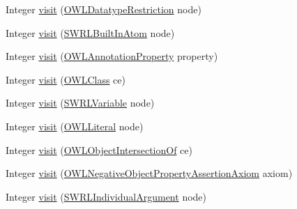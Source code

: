 \begin{DoxyCompactItemize}
\item 
Integer \hyperlink{classorg_1_1semanticweb_1_1owlapi_1_1util_1_1_maximum_modal_depth_finder_a05e043f519f8f383d69facb25d736ff8}{visit} (\hyperlink{interfaceorg_1_1semanticweb_1_1owlapi_1_1model_1_1_o_w_l_datatype_restriction}{O\-W\-L\-Datatype\-Restriction} node)
\item 
Integer \hyperlink{classorg_1_1semanticweb_1_1owlapi_1_1util_1_1_maximum_modal_depth_finder_ae52d767e6f9f6c91e60ee5436693e471}{visit} (\hyperlink{interfaceorg_1_1semanticweb_1_1owlapi_1_1model_1_1_s_w_r_l_built_in_atom}{S\-W\-R\-L\-Built\-In\-Atom} node)
\item 
Integer \hyperlink{classorg_1_1semanticweb_1_1owlapi_1_1util_1_1_maximum_modal_depth_finder_a19bf5a454049a88ef388d31c29e5a9e4}{visit} (\hyperlink{interfaceorg_1_1semanticweb_1_1owlapi_1_1model_1_1_o_w_l_annotation_property}{O\-W\-L\-Annotation\-Property} property)
\item 
Integer \hyperlink{classorg_1_1semanticweb_1_1owlapi_1_1util_1_1_maximum_modal_depth_finder_a037f9af7b994ca282ddf0e9843b02f1b}{visit} (\hyperlink{interfaceorg_1_1semanticweb_1_1owlapi_1_1model_1_1_o_w_l_class}{O\-W\-L\-Class} ce)
\item 
Integer \hyperlink{classorg_1_1semanticweb_1_1owlapi_1_1util_1_1_maximum_modal_depth_finder_a57c11406f4e47a2b0a8fac41d10890ad}{visit} (\hyperlink{interfaceorg_1_1semanticweb_1_1owlapi_1_1model_1_1_s_w_r_l_variable}{S\-W\-R\-L\-Variable} node)
\item 
Integer \hyperlink{classorg_1_1semanticweb_1_1owlapi_1_1util_1_1_maximum_modal_depth_finder_ac45adcd9b4cc804182bc7886ebd8376b}{visit} (\hyperlink{interfaceorg_1_1semanticweb_1_1owlapi_1_1model_1_1_o_w_l_literal}{O\-W\-L\-Literal} node)
\item 
Integer \hyperlink{classorg_1_1semanticweb_1_1owlapi_1_1util_1_1_maximum_modal_depth_finder_abf0bafa9a1e5b19b675c9078fbac44c6}{visit} (\hyperlink{interfaceorg_1_1semanticweb_1_1owlapi_1_1model_1_1_o_w_l_object_intersection_of}{O\-W\-L\-Object\-Intersection\-Of} ce)
\item 
Integer \hyperlink{classorg_1_1semanticweb_1_1owlapi_1_1util_1_1_maximum_modal_depth_finder_af25e759fc3441dd921948c532b56b83d}{visit} (\hyperlink{interfaceorg_1_1semanticweb_1_1owlapi_1_1model_1_1_o_w_l_negative_object_property_assertion_axiom}{O\-W\-L\-Negative\-Object\-Property\-Assertion\-Axiom} axiom)
\item 
Integer \hyperlink{classorg_1_1semanticweb_1_1owlapi_1_1util_1_1_maximum_modal_depth_finder_a3a0b83af6b1eb20bb969375d98efdaaa}{visit} (\hyperlink{interfaceorg_1_1semanticweb_1_1owlapi_1_1model_1_1_s_w_r_l_individual_argument}{S\-W\-R\-L\-Individual\-Argument} node)

\end{DoxyCompactItemize}
